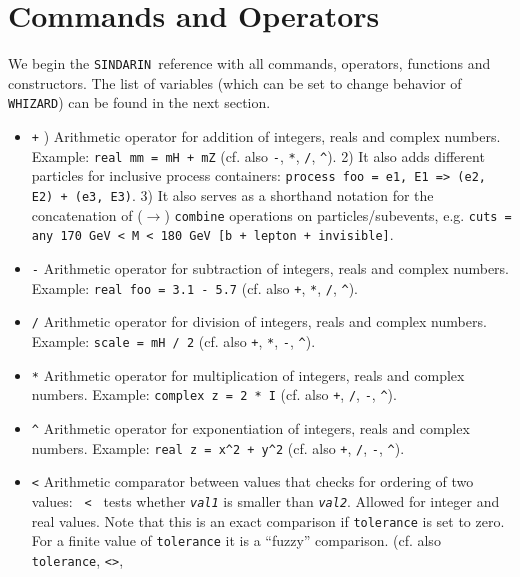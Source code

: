 \documentclass[12pt]{book}
\newcommand{\ttt}[1]{\texttt{#1}}
\newcommand{\whizard}{\ttt{WHIZARD}}
\newcommand{\sindarin}{\ttt{SINDARIN}}
\begin{document}
\section{Commands and Operators}
We begin the \sindarin\ reference with all commands, operators, functions
and constructors.
The list of variables (which can be set to change behavior of \whizard) can
be found in the next section.
\begin{itemize}
\item
\ttt{+} ) Arithmetic operator for addition of integers, reals and complex
numbers. Example: \ttt{real mm = mH + mZ} (cf. also \ttt{-}, \ttt{*},
\ttt{/}, \ttt{\^{}}). 2) It also adds different particles for inclusive
process containers: \ttt{process foo = e1, E1 => (e2, E2) + (e3,
  E3)}. 3) It also serves as a shorthand notation for the
concatenation of ($\to$) \ttt{combine} operations on
particles/subevents, e.g. \ttt{cuts = any 170 GeV < M < 180 GeV [b +
  lepton + invisible]}.
\item
\ttt{-} \newline
Arithmetic operator for subtraction of integers, reals and complex
numbers. Example: \ttt{real foo = 3.1 - 5.7} (cf. also \ttt{+}, \ttt{*},
\ttt{/}, \ttt{\^{}}).
\item
\ttt{/} \newline
Arithmetic operator for division of integers, reals and complex
numbers. Example: \ttt{scale = mH / 2} (cf. also \ttt{+}, \ttt{*},
\ttt{-}, \ttt{\^{}}).
\item
\ttt{*} \newline
Arithmetic operator for multiplication of integers, reals and complex
numbers. Example: \ttt{complex z = 2 * I} (cf. also \ttt{+}, \ttt{/},
\ttt{-}, \ttt{\^{}}).
\item
\ttt{\^{}} \newline
Arithmetic operator for exponentiation of integers, reals and complex
numbers. Example: \ttt{real z = x\^{}2 + y\^{}2} (cf. also \ttt{+},
\ttt{/}, \ttt{-}, \ttt{\^{}}).
\item
\ttt{<} \newline
Arithmetic comparator between values that checks for ordering
of two values: \ttt{{\em <val1>} < {\em <val2>}} tests whether
\ttt{{\em val1}} is smaller than \ttt{{\em val2}}. Allowed for
integer and real values. Note that this is an exact comparison if
\ttt{tolerance} is set to zero. For a finite value of \ttt{tolerance}
it is a ``fuzzy'' comparison. (cf. also \ttt{tolerance}, \ttt{<>},

\end{itemize}
\end{document}
